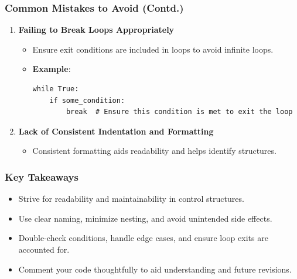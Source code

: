 \documentclass{beamer}
\begin{document}
\begin{frame}[fragile]
    \frametitle{Common Mistakes to Avoid (Contd.)}
    \begin{enumerate}[resume]
        \item \textbf{Failing to Break Loops Appropriately}
        \begin{itemize}
            \item Ensure exit conditions are included in loops to avoid infinite loops.
            \item \textbf{Example}:
            \begin{lstlisting}
while True:
    if some_condition:
        break  # Ensure this condition is met to exit the loop
            \end{lstlisting}
        \end{itemize}

        \item \textbf{Lack of Consistent Indentation and Formatting}
        \begin{itemize}
            \item Consistent formatting aids readability and helps identify structures.
        \end{itemize}
    \end{enumerate}
\end{frame}

\begin{frame}[fragile]
    \frametitle{Key Takeaways}
    \begin{itemize}
        \item Strive for readability and maintainability in control structures.
        \item Use clear naming, minimize nesting, and avoid unintended side effects.
        \item Double-check conditions, handle edge cases, and ensure loop exits are accounted for.
        \item Comment your code thoughtfully to aid understanding and future revisions.
    \end{itemize}
\end{frame}
\end{document}
